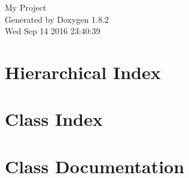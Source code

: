 \documentclass{book}
\begin{document}
\hypersetup{pageanchor=false,citecolor=blue}
\begin{titlepage}
\vspace*{7cm}
\begin{center}
{\Large My Project }\\
\vspace*{1cm}
{\large Generated by Doxygen 1.8.2}\\
\vspace*{0.5cm}
{\small Wed Sep 14 2016 23:40:39}\\
\end{center}
\end{titlepage}
\clearemptydoublepage
{}
\tableofcontents
\clearemptydoublepage
{}
\hypersetup{pageanchor=true,citecolor=blue}
\chapter{Hierarchical Index}

\chapter{Class Index}

\chapter{Class Documentation}






















\printindex
\end{document}
